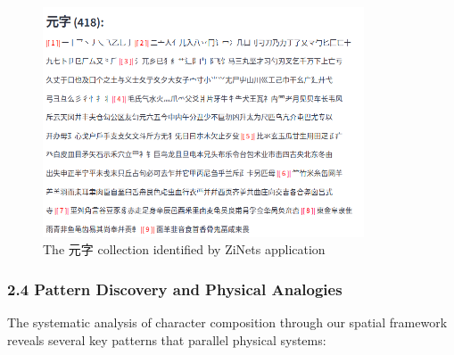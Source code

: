 \documentclass[
  11pt,
  letterpaper,
]{article}
\begin{document}
\begin{figure}
\centering
\includegraphics[width=0.85\textwidth]{./images/app_zi-elements.png}
\caption{The 元字 collection identified by ZiNets application}
\end{figure}

\subsubsection{2.4 Pattern Discovery and Physical
Analogies}\label{pattern-discovery-and-physical-analogies}

The systematic analysis of character composition through our spatial
framework reveals several key patterns that parallel physical systems:
\end{document}
